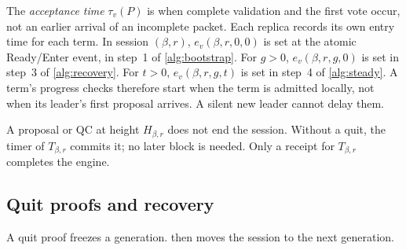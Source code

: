 \documentclass[11pt,a4paper]{article}
\newcommand{\defterm}[1]{\textcolor{rrBlue}{\textit{#1}}}
\begin{document}
The \defterm{acceptance time} $\tau_v(P)$ is when complete validation and the first
vote occur, not an earlier arrival of an incomplete packet. Each replica
records its own entry time for each term. In session $(\beta,r)$, $e_v(\beta,r,0,0)$ is
set at the atomic Ready/Enter event, in step~1 of \cref{alg:bootstrap}. For $g>0$, $e_v(\beta,r,g,0)$ is
set in step~3 of \cref{alg:recovery}. For $t>0$, $e_v(\beta,r,g,t)$ is set in
step~4 of \cref{alg:steady}. A term's progress checks therefore start
when the term is admitted locally, not when its leader's first proposal
arrives. A silent new leader cannot delay them.

A proposal or QC at height $H_{\beta,r}$ does not end the session. Without a
quit, the timer of $T_{\beta,r}$ commits it; no later block is needed. Only a
receipt for $T_{\beta,r}$ completes the engine.

\subsection{Quit proofs and recovery}
\label{sec:quit}
A quit proof freezes a generation.  then moves the
session to the next generation.
\end{document}

